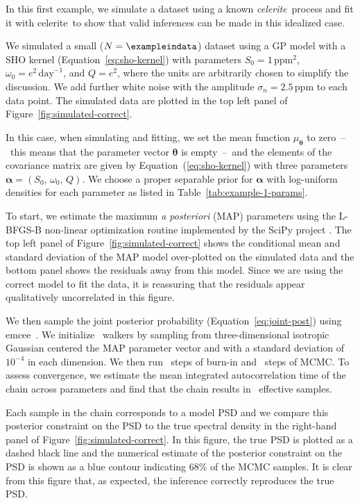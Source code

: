 \documentclass[manuscript, letterpaper]{aastex6}
\makeatletter
\let\origsubsection\subsection
\renewcommand\subsection{\@ifstar{\starsubsection}{\nostarsubsection}}
\newcommand\nostarsubsection[1]{\subsectionprelude\origsubsection{#1}}
\newcommand\starsubsection[1]{\subsectionprelude\origsubsection*{#1}}
\newcommand\subsectionprelude{\vspace{1em}}
\newcommand{\project}[1]{\textsf{#1}}
\newcommand{\celerite}{\project{celerite}}
\newcommand{\celeriteterm}{\emph{celerite}}
\newcommand{\emcee}{\project{emcee}}
\newcommand{\figureref}[1]{\ref{fig:#1}}
\newcommand{\Figure}[1]{Figure~\figureref{#1}}
\renewcommand{\eqref}[1]{\ref{eq:#1}}
\newcommand{\Eq}[1]{Equation~(\eqref{#1})}
\newcommand{\eq}[1]{\Eq{#1}}
\newcommand{\eqalt}[1]{Equation~\eqref{#1}}
\newcommand{\sectlabel}[1]{\label{sect:#1}}
\newcommand{\bvec}[1]{{\ensuremath{\boldsymbol{#1}}}}
\newcommand{\response}[1]{{\color{blue}#1}}
\makeatother
\begin{document}
\subsection{Example 1: Recovery of a celerite process}\sectlabel{example1}

In this first example, we simulate a dataset using a known \celeriteterm\
process and fit it with \celerite\ to show that valid inferences can be made
in this idealized case.
\response{We simulated a small ($N = \exampleindata$) dataset using a GP model
with a SHO kernel (\eqalt{sho-kernel}) with parameters $S_0 =
1\,\mathrm{ppm}^2$, $\omega_0 = e^2\,\mathrm{day}^{-1}$, and $Q = e^2$, where
the units are arbitrarily chosen to simplify the discussion.
We add further white noise with the amplitude $\sigma_n = 2.5\, \mathrm{ppm}$
to each data point.
The simulated data are plotted in the top left panel of
\Figure{simulated-correct}.

In this case, when simulating and fitting, we set the mean function
$\mu_\bvec{\theta}$ to zero~--~this means that the parameter vector
$\bvec{\theta}$ is empty~--~and the elements of the covariance matrix are
given by \eq{sho-kernel} with three parameters $\bvec{\alpha} = (S_0,\,
\omega_0,\,Q)$.
We choose a proper separable prior for $\bvec{\alpha}$ with log-uniform
densities for each parameter as listed in Table~\ref{tab:example-1-params}.

To start, we estimate the maximum \emph{a posteriori} (MAP) parameters using
the \project{L-BFGS-B} non-linear optimization routine \citep{Byrd:1995,
Zhu:1997} implemented by the \project{SciPy} project \citep{Jones:2001}.
The top left panel of \Figure{simulated-correct} shows the conditional mean
and standard deviation of the MAP model over-plotted on the simulated data and
the bottom panel shows the residuals away from this model.
Since we are using the correct model to fit the data, it is reassuring that
the residuals appear qualitatively uncorrelated in this figure.

We then sample the joint posterior probability (\eqalt{joint-post}) using
\emcee\ \citep{Goodman:2010, Foreman-Mackey:2013}.
We initialize \exampleinwalkers~walkers by sampling from three-dimensional
isotropic Gaussian centered the MAP parameter vector and with a standard
deviation of $10^{-4}$ in each dimension.
We then run \exampleinburn~steps of burn-in and \exampleinsteps~steps of MCMC.
To assess convergence, we estimate the mean integrated autocorrelation time of
the chain across parameters \citep{Sokal:1989, Goodman:2010} and find that the
chain results in \exampleineff~effective samples.

Each sample in the chain corresponds to a model PSD and we compare this
posterior constraint on the PSD to the true spectral density in the
right-hand panel of \Figure{simulated-correct}.
In this figure, the true PSD is plotted as a dashed black line and the
numerical estimate of the posterior constraint on the PSD is shown as a blue
contour indicating 68\% of the MCMC samples.
It is clear from this figure that, as expected, the inference correctly
reproduces the true PSD.
}
\end{document}

